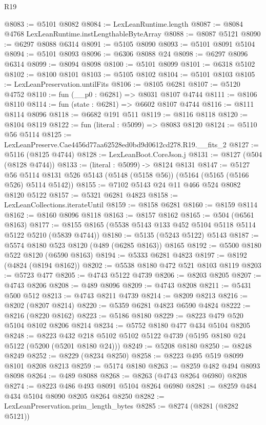 \begin{lexlean}{R19}
\begin{coremodule}
{{{{{{{{{{{@8083 := @5101 @8082
@8084 := LexLeanRuntime.length
@8087 := @8084 @4768 LexLeanRuntime.instLengthableByteArray
@8088 := @8087 @5121
@8090 := @6297 @8088 @6314
@8091 := @5105 @8090
@8093 := @5101 @8091 @5104
@8094 := @5101 @8093
@8096 := @6306 @8088 @24
@8098 := @6297 @8096 @6314
@8099 := @8094 @8098
@8100 := @5101 @8099
@8101 := @6318 @5102
@8102 := @8100 @8101
@8103 := @5105 @8102
@8104 := @5101 @8103
@8105 := LexLeanPreservation.untilFits
@8106 := @8105 @6281
@8107 := @5120 @4752
@8110 := fun (__p0 : @6281) => @8031 @8107 @4744
@8111 := @8106 @8110
@8114 := fun (state : @6281) => @6602 @8107 @4744
@8116 := @8111 @8114 @8096
@8118 := @6682 @191 @511
@8119 := @8116 @8118
@8120 := @8104 @8119
@8122 := fun (literal : @5099) => @8083 @8120
@8124 := @5110 @56 @5114
@8125 := LexLeanPreserve.Cae4456d77aa62528ed0bd9d0612cd278.R19.__fits_2
@8127 := @5116 (@8125 @4744)
@8128 := LexLeanBoot.CoreJson.j
@8131 := @8127 (@504 (@8128 @4744))
@8133 := (literal : @5099) -> @8124 @8131
@8147 := @5127
    @56
    @5114
    @8131
    @526
    @5143
    (@5148 (@5158 @56))
    (@5164 (@5165 (@5166 @526) @5114 @5142))
@8155 := @7102 @5143 @24 @11 @466 @524 @8082 @8120 @5122
@8157 := @5321 @6281 @4823
@8158 := LexLeanCollections.iterateUntil
@8159 := @8158 @6281
@8160 := @8159 @8114
@8162 := @8160 @8096 @8118
@8163 := @8157 @8162
@8165 := @504 (@6561 @8163)
@8177 := @8155 @8165 (@5538 @5143 @133 @452 @5104 @5118 @5114 @5122 @5210 (@5839 @4744))
@8180 := @5135 (@5243 @5122) @5143
@8187 := @5574 @8180 @523 @8120 (@489 (@6285 @8163)) @8165
@8192 := @5500 @8180 @522 @8120 (@6590 @8163)
@8194 := @5333 @6281 @4823
@8197 := @8192 (@4824 (@8194 @8162))
@8202 := @5538 @8180 @472 @521 @8103 @8119
@8203 := @5723 @477
@8205 := @4743 @5122 @4739
@8206 := @8203 @8205
@8207 := @4743 @8206
@8208 := @489 @8096
@8209 := @4743 @8208
@8211 := @5431 @500 @512
@8213 := @4743 @8211 @4739
@8214 := @8209 @8213
@8216 := @8202 (@8207 @8214)
@8220 := @5359 @6281 @4823 @6590 @4824
@8222 := @8216 (@8220 @8162)
@8223 := @5186 @8180
@8229 := @8223 @479 @520 @5104 @8102 @8206 @8214
@8234 := @5752 @8180 @477 @434 @5104 @8205
@8248 := @8223 @432 @218 @5102 @5102 @5122 @4739 (@5195 @8180 @24 @5122 (@5200 (@5201 @8180 @24)))
@8249 := @5208 @8180
@8250 := @8248 @8249
@8252 := @8229 (@8234 @8250)
@8258 := @8223 @495 @519 @8099 @8101 @8208 @8213
@8259 := @5174 @8180
@8263 := @8259 @482 @494 @8093 @8098
@8264 := @489 @8088
@8268 := @8263 (@4743 @8264 @6980) @8208
@8274 := @8223 @486 @493 @8091 @5104 @8264 @6980
@8281 := @8259 @484 @434 @5104 @8090 @8205 @8264 @8250
@8282 := LexLeanPreservation.prim_length_bytes
@8285 := @8274 (@8281 (@8282 @5121))
}}}}}}}}}}}
\end{coremodule}
\end{lexlean}
